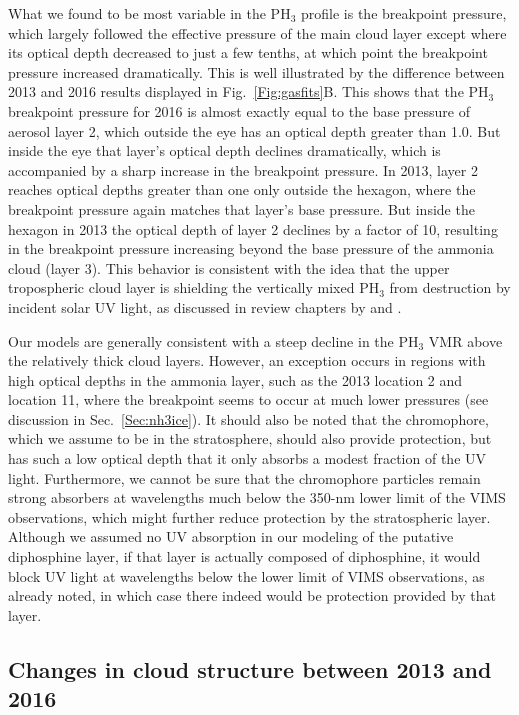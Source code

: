 \documentclass[article,11pt]{emulateapj}
\def\pht{PH$_3$ }
\begin{document}
 What we found to be most variable in the \pht profile is the
 breakpoint pressure, which largely followed the effective pressure of
 the main cloud layer except where its optical depth decreased to just
 a few tenths, at which point the breakpoint pressure increased dramatically. This is well illustrated
 by the difference between 2013 and 2016 results displayed in
 Fig.\ \ref{Fig:gasfits}B. This shows that the \pht breakpoint
 pressure for 2016 is almost exactly equal to the base pressure of
 aerosol layer 2, which outside the eye has an optical depth greater
 than 1.0. But inside the eye that layer's optical depth declines
 dramatically, which is accompanied by a sharp increase in the
 breakpoint pressure.  In 2013, layer 2 reaches optical depths greater
 than one only outside the hexagon, where the breakpoint pressure
 again matches that layer's base pressure.  But inside the hexagon in
 2013 the optical depth of layer 2 declines by a factor of 10,
 resulting in the breakpoint pressure increasing
beyond the base pressure of the ammonia cloud (layer 3).  This behavior is consistent
 with the idea that the upper tropospheric cloud layer is shielding
 the vertically mixed \pht from destruction by incident solar UV
 light, as discussed in review chapters by \cite{Fouchet2009} and
 \cite{Fletcher2019book}.  

Our models are generally consistent with a steep
 decline in the \pht VMR above the relatively thick cloud layers. However,
an exception occurs in regions with high optical depths in the
ammonia layer, such as the 2013 location 2 and location 11, where the
breakpoint seems to occur at much lower pressures (see discussion in Sec.\ \ref{Sec:nh3ice}).  It
 should also be noted that the chromophore, which we assume to be in the
 stratosphere, should also provide protection, but has such a low
 optical depth that it only absorbs a modest fraction of the UV
 light. Furthermore, we cannot be sure that the chromophore particles
 remain strong absorbers at wavelengths much below the 350-nm lower
 limit of the VIMS observations, which might further reduce protection
 by the stratospheric layer.  Although we assumed no UV absorption in
 our modeling of the putative diphosphine layer, if that layer is
 actually composed of diphosphine, it would block UV light at
 wavelengths below the lower limit of VIMS observations, as already
 noted, in which case there indeed would be protection provided by
 that layer.

\subsection{Changes in cloud structure between 2013 and 2016}
\end{document}
